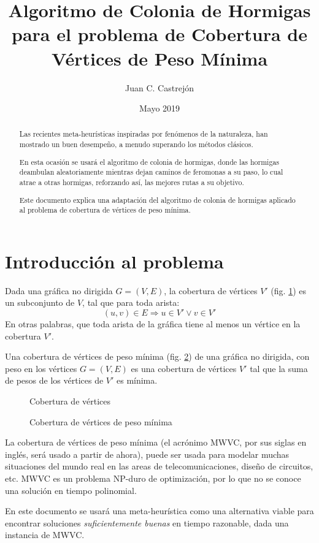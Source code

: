 \documentclass[12pt, letterpaper]{article}
\title{Algoritmo de Colonia de Hormigas para el problema de Cobertura de Vértices de Peso Mínima}
\author{Juan C. Castrejón}
\date{Mayo 2019}
\begin{document}
\maketitle
\newcommand{\R}{\mathbb{R}}
\renewcommand{\abstractname}{Resumen}
\renewcommand{\algorithmcfname}{Procedimiento}
\renewcommand{\refname}{Referencias}
\renewcommand{\figurename}{Figura}

\begin{abstract}
Las recientes meta-heurísticas inspiradas por fenómenos de la naturaleza, han mostrado un buen desempeño, a menudo superando los métodos clásicos.
\par
En esta ocasión se usará el algoritmo de colonia de hormigas, donde las hormigas deambulan aleatoriamente mientras dejan caminos de feromonas a su paso, lo cual atrae a otras hormigas, reforzando así, las mejores rutas a su objetivo.
\par
Este documento explica una adaptación del algoritmo de colonia de hormigas aplicado al problema de cobertura de vértices de peso mínima.
\end{abstract}


\section{Introducción al problema}
Dada una gráfica no dirigida $G=(V, E)$, la cobertura de vértices $V'$ (fig. \ref{fig:1}) es un subconjunto de $V$, tal que para toda arista:
\begin{equation}
(u,v) \in E \Rightarrow u \in V' \lor v \in V'
\end{equation}
En otras palabras, que toda arista de la gráfica tiene al menos un vértice en la cobertura $V'$.
\par
Una cobertura de vértices de peso mínima (fig. \ref{fig:2}) de una gráfica no dirigida, con peso en los vértices $G=(V, E)$ es una cobertura de vértices $V'$ tal que la suma de pesos de los vértices de $V'$ es mínima.

\begin{figure}[H]
  \centering
  
  \caption{Cobertura de vértices}
  \label{fig:1}
\end{figure}

\begin{figure}[H]
  \centering
  
  \caption{Cobertura de vértices de peso mínima}
  \label{fig:2}
\end{figure}

La cobertura de vértices de peso mínima (el acrónimo MWVC, por sus siglas en inglés, será usado a partir de ahora), puede ser usada para modelar muchas situaciones del mundo real en las areas de telecomunicaciones, diseño de circuitos, etc. MWVC es un problema NP-duro de optimización, por lo que no se conoce una solución en tiempo polinomial.
\par
En este documento se usará una meta-heurística como una alternativa viable para encontrar soluciones \textit{suficientemente buenas} en tiempo razonable, dada una instancia de MWVC.
\end{document}
